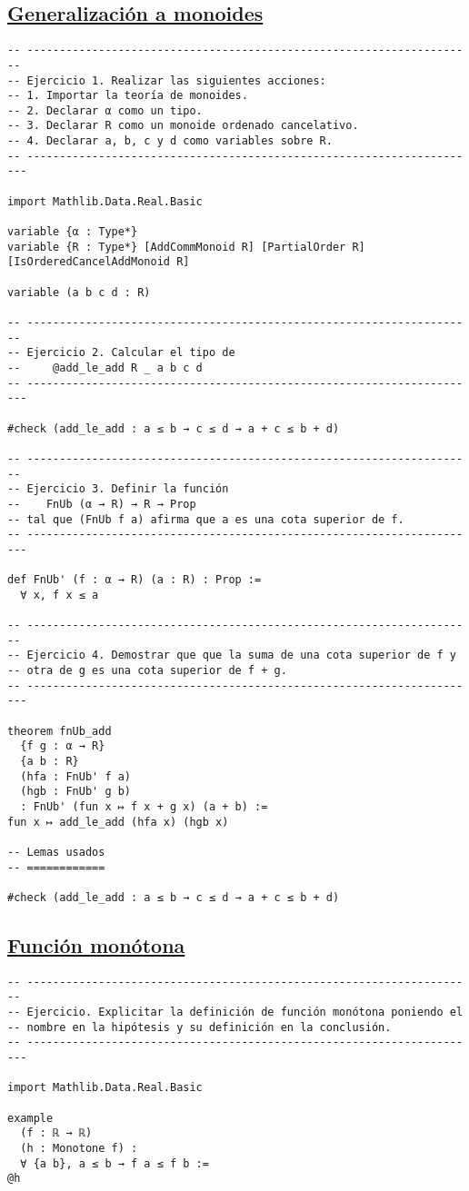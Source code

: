 \subsection{\href{./src/Logica/Generalizacion\_a\_monoides.lean}{Generalización a monoides}}
\label{sec:orgf381064}
\begin{verbatim}
-- ---------------------------------------------------------------------
-- Ejercicio 1. Realizar las siguientes acciones:
-- 1. Importar la teoría de monoides.
-- 2. Declarar α como un tipo.
-- 3. Declarar R como un monoide ordenado cancelativo.
-- 4. Declarar a, b, c y d como variables sobre R.
-- ----------------------------------------------------------------------

import Mathlib.Data.Real.Basic

variable {α : Type*}
variable {R : Type*} [AddCommMonoid R] [PartialOrder R] [IsOrderedCancelAddMonoid R]

variable (a b c d : R)

-- ---------------------------------------------------------------------
-- Ejercicio 2. Calcular el tipo de
--     @add_le_add R _ a b c d
-- ----------------------------------------------------------------------

#check (add_le_add : a ≤ b → c ≤ d → a + c ≤ b + d)

-- ---------------------------------------------------------------------
-- Ejercicio 3. Definir la función
--    FnUb (α → R) → R → Prop
-- tal que (FnUb f a) afirma que a es una cota superior de f.
-- ----------------------------------------------------------------------

def FnUb' (f : α → R) (a : R) : Prop :=
  ∀ x, f x ≤ a

-- ---------------------------------------------------------------------
-- Ejercicio 4. Demostrar que que la suma de una cota superior de f y
-- otra de g es una cota superior de f + g.
-- ----------------------------------------------------------------------

theorem fnUb_add
  {f g : α → R}
  {a b : R}
  (hfa : FnUb' f a)
  (hgb : FnUb' g b)
  : FnUb' (fun x ↦ f x + g x) (a + b) :=
fun x ↦ add_le_add (hfa x) (hgb x)

-- Lemas usados
-- ============

#check (add_le_add : a ≤ b → c ≤ d → a + c ≤ b + d)
\end{verbatim}

\subsection{\href{./src/Logica/Funcion\_monotona.lean}{Función monótona}}
\label{sec:orgf495dd3}
\begin{verbatim}
-- ---------------------------------------------------------------------
-- Ejercicio. Explicitar la definición de función monótona poniendo el
-- nombre en la hipótesis y su definición en la conclusión.
-- ----------------------------------------------------------------------

import Mathlib.Data.Real.Basic

example
  (f : ℝ → ℝ)
  (h : Monotone f) :
  ∀ {a b}, a ≤ b → f a ≤ f b :=
@h
\end{verbatim}

